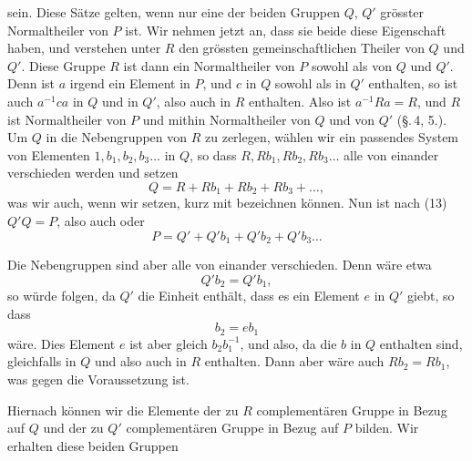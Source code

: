 sein. Diese Sätze gelten, wenn nur eine der beiden Gruppen $Q$, $Q'$
grösster Normaltheiler von $P$ ist. Wir nehmen jetzt an, dass sie
beide diese Eigenschaft haben, und verstehen unter $R$ den grössten
gemeinschaftlichen Theiler von $Q$ und $Q'$. Diese Gruppe $R$ ist
dann ein Normaltheiler von $P$ sowohl als von $Q$ und $Q'$. Denn ist
$a$ irgend ein Element in $P$, und $c$ in $Q$ sowohl als in $Q'$
enthalten, so ist auch $a^{-1}ca$ in $Q$ und in $Q'$, also auch in
$R$ enthalten. Also ist $a^{-1}Ra = R$, und $R$ ist Normaltheiler
von $P$ und mithin Normaltheiler von $Q$ und von $Q'$ (\S.\,4, 5.).
Um $Q$ in die Nebengruppen von $R$ zu zerlegen, wählen wir ein
passendes System von Elementen $1, b_1, b_2, b_3 \ldots$ in $Q$, so
dass $R, Rb_1, Rb_2, Rb_3 \ldots$ alle von einander verschieden
werden und setzen
\[
Q = R + Rb_1 + Rb_2 + Rb_3 + \ldots,
\]
was wir auch, wenn wir
setzen, kurz mit
bezeichnen können. Nun ist nach (13) $Q'Q = P$, also auch
oder
\[
P = Q' + Q'b_1 + Q'b_2 + Q'b_3 \ldots
\]

Die Nebengruppen
sind aber alle von einander verschieden. Denn wäre etwa
\[
Q'b_2 = Q'b_1,
\]
so würde folgen, da $Q'$ die Einheit enthält, dass es ein Element
$e$ in $Q'$ giebt, so dass
\[
b_2 = eb_1
\]
wäre. Dies Element $e$ ist aber gleich $b_2b_1^{-1}$, und also, da
die $b$ in $Q$ enthalten sind, gleichfalls in $Q$ und also auch in
$R$ enthalten. Dann aber wäre auch $Rb_2 = Rb_1$, was gegen die
Voraussetzung ist.

Hiernach können wir die Elemente der zu $R$ complementären Gruppe
in Bezug auf $Q$ und der zu $Q'$ complementären Gruppe in Bezug auf
$P$ bilden. Wir erhalten diese beiden Gruppen
